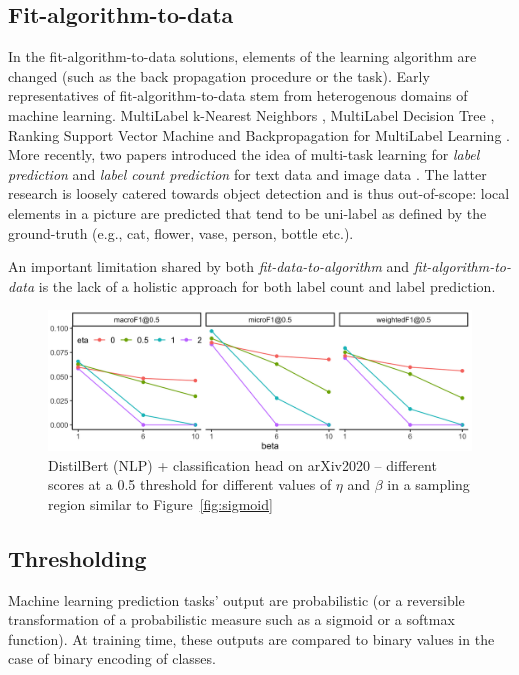 \subsection{Fit-algorithm-to-data}
In the fit-algorithm-to-data solutions, elements of the learning
algorithm are changed (such as the back propagation procedure or the task).
Early representatives of fit-algorithm-to-data stem from heterogenous domains
of machine learning. MultiLabel k-Nearest Neighbors \cite{ML-KNN},
MultiLabel Decision Tree \cite{ML-DT}, Ranking Support Vector Machine
\cite{multilabelSVM} and Backpropagation for MultiLabel Learning
\cite{multilabelBackprop}. More recently, two papers introduced the idea of
multi-task learning for \emph{label prediction} and \emph{label count
prediction} for text data \cite[ML\(_{\text{NET}}\)][]{multitaskLabel} and image
data \cite{multitaskLabelImages, tencent}. The latter research is loosely
catered towards object detection and is thus out-of-scope: local elements in a picture are predicted that tend to be uni-label as defined by the ground-truth (e.g., cat, flower, vase, person, bottle
etc.).

An important limitation shared by both \emph{fit-data-to-algorithm} and \emph{fit-algorithm-to-data} is the lack of a holistic approach for both label count and label prediction.

\begin{figure}[t!]
\centering
\includegraphics[width=.9\linewidth]{./images/betaEtaResized.png}
\vspace{1\baselineskip}
\caption{\label{fig:betaEta}
DistilBert (NLP) + classification head on arXiv2020 – different scores at a 0.5 threshold for different values of $\eta$ and $\beta$ in a sampling region similar to Figure~\ref{fig:sigmoid}}
\end{figure}

\subsection{Thresholding}
\label{subsec:thresh}

Machine learning prediction tasks' output are probabilistic (or a reversible transformation of a probabilistic measure such as a sigmoid or a softmax function).
At training time, these outputs are compared to binary
values in the case of binary encoding of classes.

